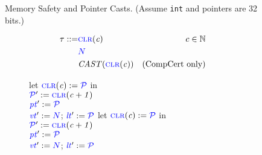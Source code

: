 \documentclass{llncs}
\begin{document}
\begin{figure}

\caption{Memory Safety and Pointer Casts. (Assume {\tt int} and pointers are 32 bits.)}
\label{fig:memsafe}
\end{figure}

\begin{figure}
      \color{blue}
  \begin{subfigure}{\textwidth}
    \begin{minipage}{0.45\textwidth}
      \begin{align*}
        \tau ::= & \clr & c \in \mathbb{N} \\
        & \N \\
        & \mathit{CAST}(\clr) & \textnormal{(CompCert only)} \\
      \end{align*}
    \end{minipage}
    \scriptsize
    \begin{minipage}{0.3\textwidth}
      \localtruleblock
          {let \(\clr := \PCT\) in \\
            \(\PCT' := \clr[c+1]\) \\
            \(\pt' := \PCT\)\\
            \(\vt' := \N\);
            \(\lt' := \PCT\)
          }
      \malloctruleblock
          {let \(\clr := \PCT\) in \\
            \(\PCT' := \clr[c+1]\) \\
            \(\pt' := \PCT\) \\
            \(\vt' := \N\);
            \(\lt' := \PCT\)
          }
    \end{minipage}
    \begin{minipage}{0.2\textwidth}

    \end{minipage}


\end{subfigure}
\end{figure}
\end{document}
